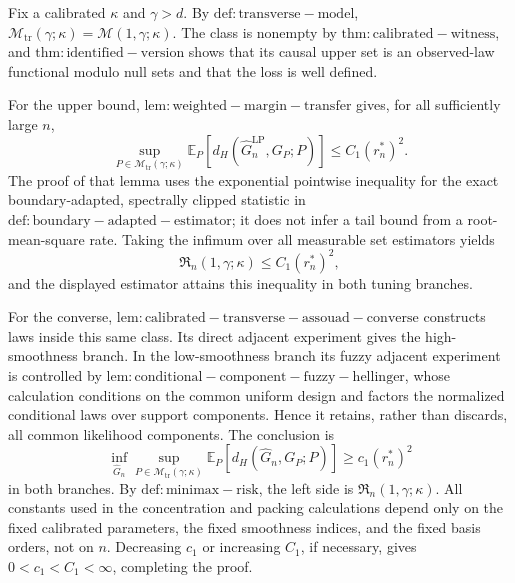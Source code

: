 Fix a calibrated \(\kappa\) and \(\gamma>d\). By \(\mathrm{def:transverse-model}\), \(\mathcal M_{\mathrm{tr}}(\gamma;\kappa)=\mathcal M(1,\gamma;\kappa)\). The class is nonempty by \(\mathrm{thm:calibrated-witness}\), and \(\mathrm{thm:identified-version}\) shows that its causal upper set is an observed-law functional modulo null sets and that the loss is well defined.

For the upper bound, \(\mathrm{lem:weighted-margin-transfer}\) gives, for all sufficiently large \(n\),
\[
\sup_{P\in\mathcal M_{\mathrm{tr}}(\gamma;\kappa)}
 \mathbb E_P\!\left[d_H(\widehat G_n^{\mathrm{LP}},G_P;P)\right]
 \le C_1(r_n^*)^2.
\]
The proof of that lemma uses the exponential pointwise inequality for the exact boundary-adapted, spectrally clipped statistic in \(\mathrm{def:boundary-adapted-estimator}\); it does not infer a tail bound from a root-mean-square rate. Taking the infimum over all measurable set estimators yields
\[
\mathfrak R_n(1,\gamma;\kappa)\le C_1(r_n^*)^2,
\]
and the displayed estimator attains this inequality in both tuning branches.

For the converse, \(\mathrm{lem:calibrated-transverse-assouad-converse}\) constructs laws inside this same class. Its direct adjacent experiment gives the high-smoothness branch. In the low-smoothness branch its fuzzy adjacent experiment is controlled by \(\mathrm{lem:conditional-component-fuzzy-hellinger}\), whose calculation conditions on the common uniform design and factors the normalized conditional laws over support components. Hence it retains, rather than discards, all common likelihood components. The conclusion is
\[
\inf_{\widehat G_n}\sup_{P\in\mathcal M_{\mathrm{tr}}(\gamma;\kappa)}
 \mathbb E_P\!\left[d_H(\widehat G_n,G_P;P)\right]
 \ge c_1(r_n^*)^2
\]
in both branches. By \(\mathrm{def:minimax-risk}\), the left side is \(\mathfrak R_n(1,\gamma;\kappa)\). All constants used in the concentration and packing calculations depend only on the fixed calibrated parameters, the fixed smoothness indices, and the fixed basis orders, not on \(n\). Decreasing \(c_1\) or increasing \(C_1\), if necessary, gives \(0<c_1<C_1<\infty\), completing the proof.